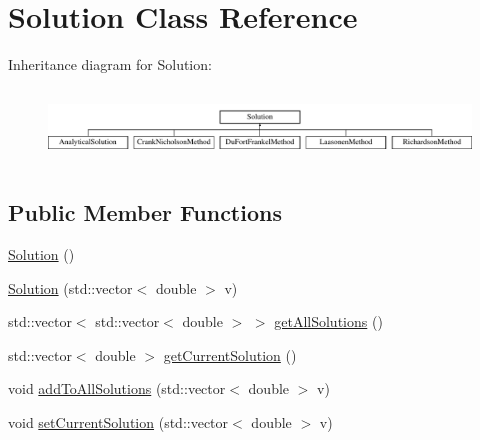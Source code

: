 \hypertarget{class_solution}{}\section{Solution Class Reference}
\label{class_solution}
Inheritance diagram for Solution\+:\begin{figure}[H]
\begin{center}
\leavevmode
\includegraphics[height=2.000000cm]{class_solution}
\end{center}
\end{figure}
\subsection*{Public Member Functions}
\begin{DoxyCompactItemize}
\item 
\hyperlink{class_solution_ab55bd4b023d596ce11aaf737b9a6123b}{Solution} ()
\item 
\hyperlink{class_solution_a3a2983c7a229e6d7408471b4dc48fe61}{Solution} (std\+::vector$<$ double $>$ v)
\item 
std\+::vector$<$ std\+::vector$<$ double $>$ $>$ \hyperlink{class_solution_abd28abd062adb793866fd5e1c8ef8639}{get\+All\+Solutions} ()
\item 
std\+::vector$<$ double $>$ \hyperlink{class_solution_ae92d4a6070f6e5879698754fa5547ee3}{get\+Current\+Solution} ()
\item 
void \hyperlink{class_solution_a0ea58d9480ccb4e344c377f4861e1e7f}{add\+To\+All\+Solutions} (std\+::vector$<$ double $>$ v)
\item 
void \hyperlink{class_solution_a32dad1b34b687cb439a2a60881e50402}{set\+Current\+Solution} (std\+::vector$<$ double $>$ v)
\end{DoxyCompactItemize}
